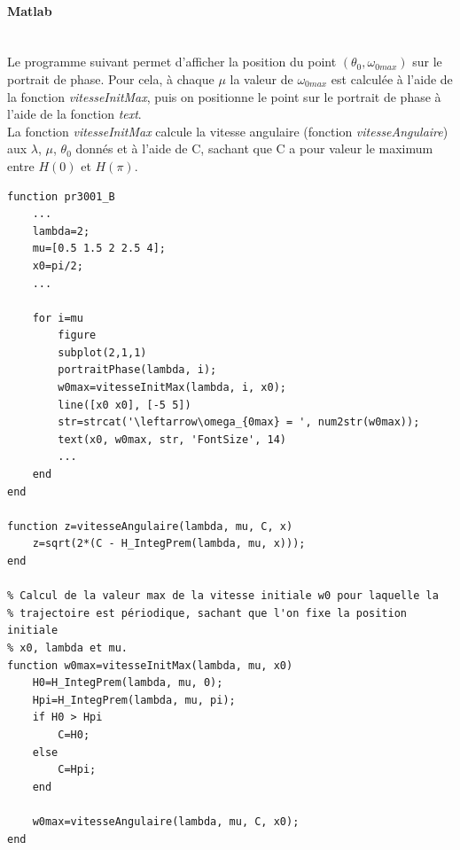 \documentclass[11pt]{article}
\begin{document}
\paragraph{Matlab}\mbox{}\\
Le programme suivant permet d'afficher la position du point $(\theta_0,\omega_{0max})$ sur le portrait de phase.
Pour cela, à chaque $\mu$ la valeur de  $\omega_{0max}$ est calculée à l'aide de la fonction \emph{vitesseInitMax}, puis on positionne le point sur le portrait de phase à l'aide de la fonction \emph{text}.\\
La fonction \emph{vitesseInitMax} calcule la vitesse angulaire (fonction \emph{vitesseAngulaire}) aux $\lambda$, $\mu$, $\theta_0$ donnés et à l'aide de C, sachant que C a pour valeur le maximum entre $H(0)$ et $H(\pi)$.

\begin{lstlisting}
function pr3001_B
    ...
    lambda=2;
    mu=[0.5 1.5 2 2.5 4];
    x0=pi/2;
    ...

    for i=mu
        figure
        subplot(2,1,1)
        portraitPhase(lambda, i);
        w0max=vitesseInitMax(lambda, i, x0);
        line([x0 x0], [-5 5])
        str=strcat('\leftarrow\omega_{0max} = ', num2str(w0max));
        text(x0, w0max, str, 'FontSize', 14)
        ...
    end
end

function z=vitesseAngulaire(lambda, mu, C, x)
    z=sqrt(2*(C - H_IntegPrem(lambda, mu, x)));
end

% Calcul de la valeur max de la vitesse initiale w0 pour laquelle la
% trajectoire est périodique, sachant que l'on fixe la position initiale
% x0, lambda et mu.
function w0max=vitesseInitMax(lambda, mu, x0)
    H0=H_IntegPrem(lambda, mu, 0);
    Hpi=H_IntegPrem(lambda, mu, pi);
    if H0 > Hpi
        C=H0;
    else
        C=Hpi;
    end

    w0max=vitesseAngulaire(lambda, mu, C, x0);
end
\end{lstlisting}
\newpage
\end{document}
